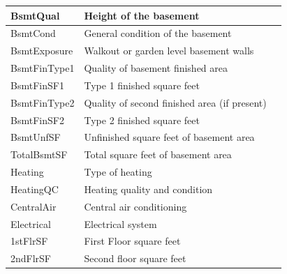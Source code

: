 \begin{longtable}{|l|p{3cm}|p{4cm}|}
    \hline
    BsmtQual         & Height of the basement                                                                           \\
    \hline
    BsmtCond         & General condition of the basement                                                                \\
    \hline
    BsmtExposure     & Walkout or garden level basement walls                                                           \\
    \hline
    BsmtFinType1     & Quality of basement finished area                                                                \\
    \hline
    BsmtFinSF1       & Type 1 finished square feet                                                                      \\
    \hline
    BsmtFinType2     & Quality of second finished area (if present)                                                     \\
    \hline
    BsmtFinSF2       & Type 2 finished square feet                                                                      \\
    \hline
    BsmtUnfSF        & Unfinished square feet of basement area                                                          \\
    \hline
    TotalBsmtSF      & Total square feet of basement area                                                               \\
    \hline
    Heating          & Type of heating                                                                                  \\
    \hline
    HeatingQC        & Heating quality and condition                                                                    \\
    \hline
    CentralAir       & Central air conditioning                                                                         \\
    \hline
    Electrical       & Electrical system                                                                                \\
    \hline
    1stFlrSF         & First Floor square feet                                                                          \\
    \hline
    2ndFlrSF         & Second floor square feet                                                                         \\

\end{longtable}
